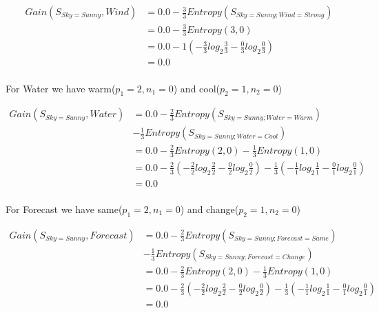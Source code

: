 \documentclass[10pt,a4paper]{article}
\begin{document}
{{{{{{{{{{\begin{equation}
\begin{split}
Gain(S_{Sky=Sunny},Wind) &= 0.0 - \frac{3}{3} Entropy(S_{Sky=Sunny;Wind=Strong} )\\
          &= 0.0 - \frac{3}{3} Entropy(3,0) \\
          &= 0.0 - 1( -\frac{3}{3} log_2\frac{3}{3} -\frac{0}{3} log_2\frac{0}{3} )  \\
          &= 0.0 \\
\end{split}
\end{equation}

For Water we have warm($p_1=2,n_1=0$) and cool($p_2=1,n_2=0$)

\begin{equation}
\begin{split}
Gain(S_{Sky=Sunny},Water) &= 0.0 - \frac{2}{3} Entropy(S_{Sky=Sunny;Water=Warm} ) \\
&-
    \frac{1}{3}Entropy(S_{Sky=Sunny;Water=Cool})\\
          &= 0.0 - \frac{2}{3} Entropy(2,0) - \frac{1}{3}Entropy(1,0)\\
          &= 0.0 - \frac{2}{3}( -\frac{2}{2} log_2\frac{2}{2} -\frac{0}{2} log_2\frac{0}{2} ) -\frac{1}{3}( -\frac{1}{1}log_2\frac{1}{1} - \frac{0}{1}log_2\frac{0}{1} )  \\
          &= 0.0 \\
\end{split}
\end{equation}

For Forecast we have same($p_1=2,n_1=0$) and change($p_2=1,n_2=0$)

\begin{equation}
\begin{split}
Gain(S_{Sky=Sunny},Forecast) &= 0.0 - \frac{2}{3} Entropy(S_{Sky=Sunny;Forecast=Same} ) \\
&-
    \frac{1}{3}Entropy(S_{Sky=Sunny;Forecast=Change})\\
          &= 0.0 - \frac{2}{3} Entropy(2,0) - \frac{1}{3}Entropy(1,0)\\
          &= 0.0 - \frac{2}{3}( -\frac{2}{2} log_2\frac{2}{2} -\frac{0}{2} log_2\frac{0}{2} ) -\frac{1}{3}( -\frac{1}{1}log_2\frac{1}{1} - \frac{0}{1}log_2\frac{0}{1} )  \\
          &= 0.0 \\
\end{split}
\end{equation}

}}}}}}}}}}
\end{document}
